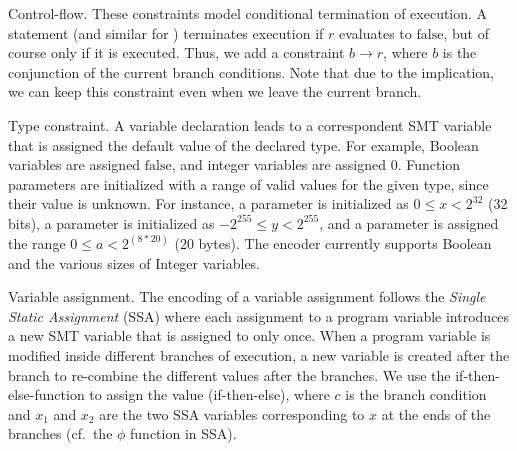 \begin{paragraph}{Control-flow.}
These constraints model conditional termination of execution.
A  statement (and similar for )
terminates execution if $r$ evaluates to $\mathrm{false}$, but
of course only if it is executed. Thus,
we add a constraint $b \to r$, where $b$ is the conjunction of
the current branch conditions. Note that due to the implication,
we can keep this constraint even when we leave the current branch.
\end{paragraph}

\begin{paragraph}{Type constraint.}
A variable declaration leads to a correspondent SMT variable that is assigned
the default value of the declared type.
%
For example, Boolean variables are assigned $\mathrm{false}$, and integer variables are
assigned 0.
%
Function parameters are initialized with a range of valid values for the given
type, since their value is unknown.  For instance, a parameter 
is initialized as $0 \le x < 2^{32}$ (32 bits), a parameter 
is initialized as $-2^{255} \le y < 2^{255}$, and a parameter  is assigned the range $0 \le a < 2^{(8*20)}$ (20 bytes).
%
The encoder currently supports Boolean and the various sizes of Integer
variables.

\end{paragraph}

\begin{paragraph}{Variable assignment.}
The encoding of a variable assignment follows the \emph{Single Static Assignment}
(SSA) where each assignment to a program variable introduces a new SMT variable
that is assigned to only once.
%
When a program variable is modified inside different branches of execution,
a new variable is created after the branch to re-combine the different
values after the branches.
We use the if-then-else-function  to assign the value
 (if-then-else), where $c$ is the branch
condition and $x_1$ and $x_2$ are the two SSA variables corresponding to $x$
at the ends of the branches (cf.\ the $\phi$ function in SSA).
\end{paragraph}

